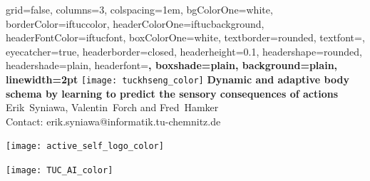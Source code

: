 \documentclass[portrait,final,a0paper,fontscale=0.3]{baposter}
\begin{document}
\begin{poster}%
	{
		grid=false,
		columns=3,
		colspacing=1em,
		bgColorOne=white,
		borderColor=iftuccolor,
		headerColorOne=iftucbackground,
		headerFontColor=iftucfont,
		boxColorOne=white,
		textborder=rounded,
		textfont=\small,
		eyecatcher=true,
		headerborder=closed,
		headerheight=0.1\textheight,
		headershape=rounded,
		headershade=plain,
		headerfont=\Large\bf, %
		boxshade=plain,
		background=plain,
		linewidth=2pt
	}
	{\texttt{[image: tuckhseng\_color]}} 
	{\bf\Large{Dynamic and adaptive body schema by learning to predict the sensory consequences of actions}\vspace{1em}}
	{\large Erik~Syniawa, Valentin~Forch and Fred~Hamker \\ \vspace{0.5em}
	\small Contact: erik.syniawa@informatik.tu-chemnitz.de
	}
	{	
		\begin{minipage}[r]{0.1\textwidth}
			\texttt{[image: active\_self\_logo\_color]}
		\end{minipage}
		\hfill
		\begin{minipage}[r]{0.1\textwidth}
			\texttt{[image: TUC\_AI\_color]}
		\end{minipage}
		
	}

\end{poster}
\end{document}
